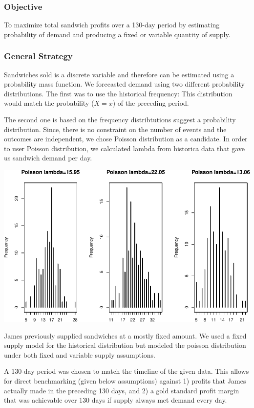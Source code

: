 \documentclass[]{article}
\begin{document}
\subsubsection{Objective}\label{objective}

To maximize total sandwich profits over a 130-day period by estimating
probability of demand and producing a fixed or variable quantity of
supply.

\subsubsection{General Strategy}\label{general-strategy}

Sandwiches sold is a discrete variable and therefore can be estimated
using a probability mass function. We forecasted demand using two
different probability distributions. The first was to use the historical
frequency: This distribution would match the probability ($X=x$) of the
preceding period.

The second one is based on the frequency distribtutions suggest a
probability distribution. Since, there is no constraint on the number of
events and the outcomes are independent, we chose Poisson distribution
as a candidate. In order to user Poisson distribution, we calculated
lambda from historica data that gave us sandwich demand per day.

\includegraphics{./IS606_Sandwich_files/figure-latex/unnamed-chunk-2.pdf}

James previously supplied sandwiches at a mostly fixed amount. We used a
fixed supply model for the historical distribution but modeled the
poisson distribution under both fixed and variable supply assumptions.

A 130-day period was chosen to match the timeline of the given data.
This allows for direct benchmarking (given below assumptions) against 1)
profits that James actually made in the preceding 130 days, and 2) a
gold standard profit margin that was achievable over 130 days if supply
always met demand every day.
\end{document}
